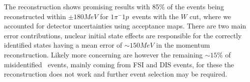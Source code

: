 \documentclass[a4paper,12pt]{article}
\newcommand{\md}{$1\pi^-1p$}
\begin{document}
The reconstruction shows promising results with 85\% of the events being reconstructed within $\pm 180\si{MeV}$ for \md\ events with the $W$ cut, where we accounted for detector uncertainties using acceptance maps.
There are two main error contributions, nuclear initial state effects are responsible for the correctly identified states having a mean error of $\sim 150 \si{MeV}$ in the momentum reconstruction.
Likely more concerning are however the remaining $\sim 15\%$ of misidentified \dm\ events, mainly coming from FSI and DIS events, for these the reconstruction does not work and further event selection may be required.

\newpage

\printbibliography

\newpage
\end{document}
